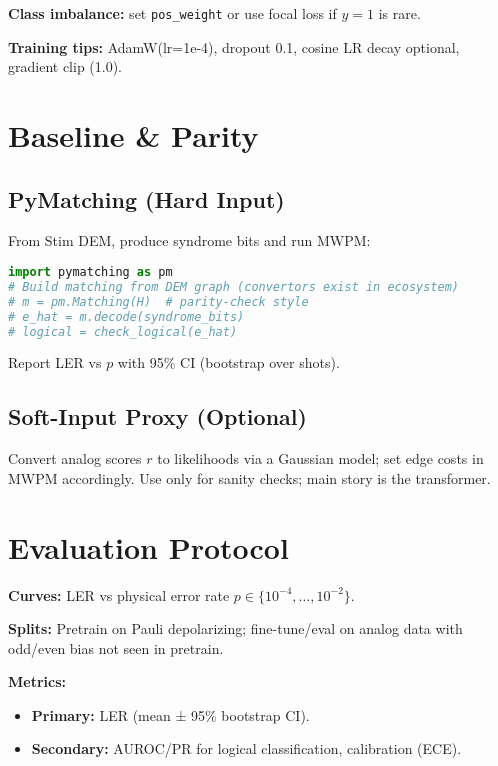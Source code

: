 \documentclass[12pt]{article}
\begin{document}
\textbf{Class imbalance:} set \texttt{pos\_weight} or use focal loss if $y=1$ is rare.

\textbf{Training tips:} AdamW(lr=1e-4), dropout 0.1, cosine LR decay optional, gradient clip (1.0).

\section{Baseline \& Parity}

\subsection{PyMatching (Hard Input)}

From Stim DEM, produce syndrome bits and run MWPM:
\begin{lstlisting}[language=Python]
import pymatching as pm
# Build matching from DEM graph (convertors exist in ecosystem)
# m = pm.Matching(H)  # parity-check style
# e_hat = m.decode(syndrome_bits)
# logical = check_logical(e_hat)
\end{lstlisting}

Report LER vs $p$ with 95\% CI (bootstrap over shots).

\subsection{Soft-Input Proxy (Optional)}

Convert analog scores $r$ to likelihoods via a Gaussian model; set edge costs in MWPM accordingly. Use only for sanity checks; main story is the transformer.

\section{Evaluation Protocol}

\textbf{Curves:} LER vs physical error rate $p \in \{10^{-4}, \ldots, 10^{-2}\}$.

\textbf{Splits:} Pretrain on Pauli depolarizing; fine-tune/eval on analog data with odd/even bias not seen in pretrain.

\textbf{Metrics:}
\begin{itemize}
    \item \textbf{Primary:} LER (mean ± 95\% bootstrap CI).
    \item \textbf{Secondary:} AUROC/PR for logical classification, calibration (ECE).
\end{itemize}
\end{document}
